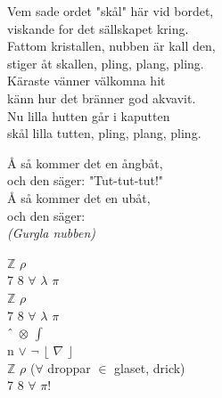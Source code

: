 \documentclass[a6paper, 10pt, twoside]{article}
\begin{document}
\newpage
\noindent
\begin{center}
\end{center}
\begin{lyrics}
Vem sade ordet "skål" här vid bordet,\\
viskande for det sällskapet kring.\\
Fattom kristallen, nubben är kall den,\\
stiger åt skallen, pling, plang, pling.\\
Käraste vänner välkomna hit\\
känn hur det bränner god akvavit.\\
Nu lilla hutten går i kaputten\\
skål lilla tutten, pling, plang, pling.
\end{lyrics}
\begin{center}
\end{center}
\begin{lyrics}
Å så kommer det en ångbåt, \\
och den säger: "Tut-tut-tut!" \\
Å så kommer det en ubåt, \\
och den säger: \\
\textit{(Gurgla nubben) }
\end{lyrics}

\begin{center}
\end{center}
\begin{lyrics}
$\mathbb{Z}$ $\rho$\\ 
7 8 $\forall$ $\lambda$ $\pi$\\ 
$\mathbb{Z}$ $\rho$\\ 
7 8 $\forall$ $\lambda$ $\pi$\\ 
$\text{\^{}}$ $\otimes$ $\int$\\
n $\vee$ $\neg$ $\lfloor$ $\nabla$ $\rfloor$\\
$\mathbb{Z}$ $\rho$ ($\forall$ droppar $\in$ glaset, drick)\\
7 8 $\forall$ $\pi$!
\end{lyrics}
\end{document}
